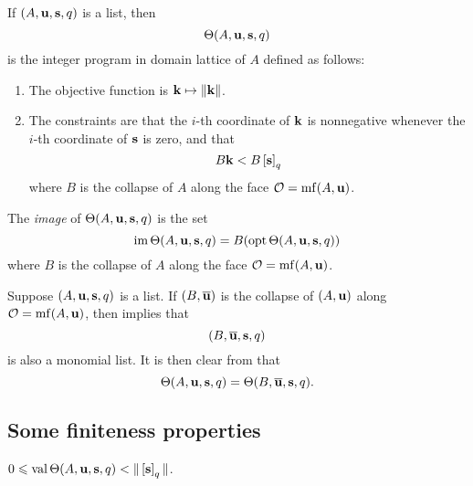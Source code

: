 \documentclass[11pt]{amsart}
\renewcommand{\!}[1]{{\color{red}\text{$\star$\,}#1\,$\star$}}
\newcommand{\ol}[1]{\overline{#1}}
\begin{document}
\begin{definition}  
\label{aux program: D}
If $(A, \mathbf{u}, \mathbf{s}, q)$ is a list, then
\[ \Theta(A, \mathbf{u}, \mathbf{s}, q) \] 
is the integer program in domain lattice of $A$ defined as follows:
\begin{enumerate}
\item The objective function is $\mathbf{k} \mapsto \| \mathbf{k} \|$.
\item The constraints are that the $i$-th coordinate of $\mathbf{k}$ is nonnegative whenever the $i$-th coordinate of $\mathbf{s}$ is zero, and that \[ B \mathbf{k}  < B \left[ \mathbf{s} \right]_q\]
where $B$ is the collapse of $A$ along the face $\mathcal{O} = \operatorname{mf}(A, \mathbf{u})$.
\end{enumerate}
\end{definition}

\begin{definition}
The \emph{image} of $\Theta(A, \mathbf{u}, \mathbf{s}, q)$ is the set \[ \operatorname{im} \Theta(A, \mathbf{u}, \mathbf{s}, q)  = B (\operatorname{opt} \Theta(A, \mathbf{u}, \mathbf{s}, q))\] 
where $B$ is the collapse of $A$ along the face $\mathcal{O} = \operatorname{mf}(A, \mathbf{u})$.
\end{definition}

\begin{remark}
\label{collapsed aux program: R}
Suppose $(A, \mathbf{u}, \mathbf{s}, q)$ is a list.  If $(B, \ol{\vv{u}})$ is the collapse of $(A ,\mathbf{u})$ along $\mathcal{O} = \operatorname{mf}(A, \mathbf{u})$, then  implies that 
\[ (B, \ol{\vv{u}}, \vv{s}, q) \] is also a monomial list.  It is then clear from  that 
\[ \ip(A, \vv{u}, \vv{s}, q) = \ip(B, \ol{\vv{u}}, \vv{s}, q). \] 
\end{remark}

\subsection{Some finiteness properties}  

\begin{lemma}
\label{bounded value: L} 
$0 \leqslant  \operatorname{val}  \Theta(A, \mathbf{u}, \mathbf{s}, q) < \| \left[ \mathbf{s} \right]_q \|$.  
\end{lemma}
\end{document}
